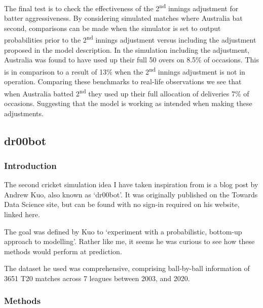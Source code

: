 The final test is to check the effectiveness of the 2\textsuperscript{nd} innings adjustment for batter aggressiveness. By considering simulated matches where Australia bat second, comparisons can be made when the simulator is set to output probabilities prior to the 2\textsuperscript{nd} innings adjustment versus including the adjustment proposed in the model description. In the simulation including the adjustment, Australia was found to have used up their full 50 overs on 8.5\% of occasions. This is in comparison to a result of 13\% when the 2\textsuperscript{nd} innings adjustment is not in operation. Comparing these benchmarks to real-life observations we see that when Australia batted 2\textsuperscript{nd} they used up their full allocation of deliveries 7\% of occasions. Suggesting that the model is working as intended when making these adjustments.

\subsection{dr00bot}

\subsubsection{Introduction}

The second cricket simulation idea I have taken inspiration from is a blog post by Andrew Kuo, also known as ‘dr00bot’. It was originally published on the Towards Data Science site, but can be found with no sign-in required on his website, linked here. \cite{kuo_predicting_2021}

The goal was defined by Kuo to ‘experiment with a probabilistic, bottom-up approach to modelling’. Rather like me, it seems he was curious to see how these methods would perform at prediction.

The dataset he used was comprehensive, comprising ball-by-ball information of 3651 T20 matches across 7 leagues between 2003, and 2020.

\subsubsection{Methods}

